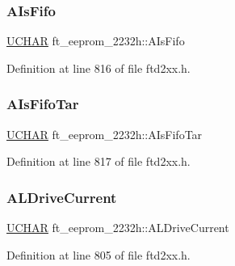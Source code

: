 \subsubsection{\texorpdfstring{A\+Is\+Fifo}{AIsFifo}}
{\footnotesize\ttfamily \hyperlink{CatCaloProto40MHz_2inc_2WinTypes_8h_a4f4bb67531a9bf6f0b9c6ad76aeba587}{U\+C\+H\+AR} ft\+\_\+eeprom\+\_\+2232h\+::\+A\+Is\+Fifo}



Definition at line 816 of file ftd2xx.\+h.

\mbox{\label{structft__eeprom__2232h_a497cfb3ec327a899ea4a8904a355abba}} 
\subsubsection{\texorpdfstring{A\+Is\+Fifo\+Tar}{AIsFifoTar}}
{\footnotesize\ttfamily \hyperlink{CatCaloProto40MHz_2inc_2WinTypes_8h_a4f4bb67531a9bf6f0b9c6ad76aeba587}{U\+C\+H\+AR} ft\+\_\+eeprom\+\_\+2232h\+::\+A\+Is\+Fifo\+Tar}



Definition at line 817 of file ftd2xx.\+h.

\mbox{\label{structft__eeprom__2232h_add083043190baacddfb71891e65f0e35}} 
\subsubsection{\texorpdfstring{A\+L\+Drive\+Current}{ALDriveCurrent}}
{\footnotesize\ttfamily \hyperlink{CatCaloProto40MHz_2inc_2WinTypes_8h_a4f4bb67531a9bf6f0b9c6ad76aeba587}{U\+C\+H\+AR} ft\+\_\+eeprom\+\_\+2232h\+::\+A\+L\+Drive\+Current}



Definition at line 805 of file ftd2xx.\+h.

\mbox{\label{structft__eeprom__2232h_aabf6af90bb51868803bb93b09f45d6fd}} 
